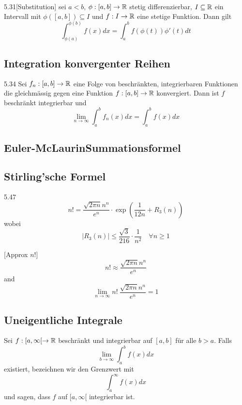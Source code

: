 \begin{satz}{5.31}[Substitution]
    sei $a < b$, $\phi: [a, b] \to \mathbb{R}$ stetig differenzierbar, $I \subseteq  \mathbb{R}$ ein Intervall mit $\phi([a, b]) \subseteq I$ und $f: I \to \mathbb{R}$ eine stetige Funktion.
    Dann gilt
    \[ \int_{\phi(a)}^{\phi(b)} f(x)dx = \int_a^b f(\phi(t)) \phi'(t) dt \]
\end{satz}

\subsection{Integration konvergenter Reihen}
\begin{satz}{5.34}
    Sei $f_n: [a, b] \to \mathbb{R}$ eine Folge von beschränkten, integrierbaren Funktionen die gleichmässig gegen eine Funktion $f: [a,b] \to \mathbb{R}$ konvergiert.
    Dann ist $f$ beschränkt integrierbar und
    \[ \lim_{n \to \infty} \int_a^b f_n(x)dx = \int_a^b f(x)dx \]
\end{satz}

\subsection{Euler-McLaurinSummationsformel}

\subsection{Stirling'sche Formel}
\begin{satz}{5.47}
    \[ n! = \frac{\sqrt{2 \pi n} n^n}{e^n} \cdot \exp \left( \frac{1}{12n} + R_3(n) \right) \]
    wobei
    \[ |R_3(n)| \le \frac{\sqrt{3}}{216} \cdot \frac{1}{n^2}\quad \forall n \ge 1 \]
\end{satz}

\begin{satz}{}[Approx $n!$]
    \[ n! \approx \frac{\sqrt{2 \pi n}n^n}{e^n} \]
    and
    \[ \lim_{n \to \infty} n! \ \frac{\sqrt{2 \pi n}n^n}{e^n} = 1 \]
\end{satz}

\subsection{Uneigentliche Integrale}
\begin{definition}
    Sei $f: [a, \infty[ \to \mathbb{R}$ beschränkt und integrierbar auf $[a,b]$ für alle $b > a$. Falls
    \[ \lim_{b \to \infty} \int_a^b f(x) dx \]
    existiert, bezeichnen wir den Grenzwert mit
    \[ \int_a^\infty f(x)dx \]
    und sagen, dass $f$ auf $[a, \infty[$ integrierbar ist.
\end{definition}

